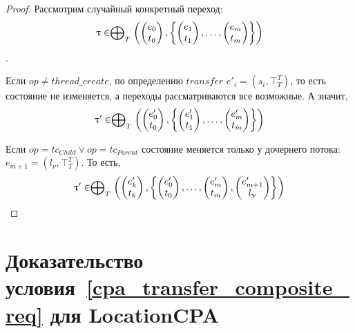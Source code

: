 \begin{proof}
Рассмотрим случайный конкретный переход:
$$\uptau \in  \mathrel{\bigoplus}_{T}
\left(
\begin{pmatrix}
e_0 \\
t_0 
\end{pmatrix},
\left\{
\begin{pmatrix}
e_1 \\
t_1 
\end{pmatrix},
\dots ,
\begin{pmatrix}
e_m \\
t_m 
\end{pmatrix}
\right\}
\right)$$.

Если $op \neq thread\_create$, по определению $transfer$ $e'_i = (s_i, \top^T_T)$, то есть состояние не изменяется, а переходы рассматриваются все возможные. 
А значит, 
$$\uptau' \in  \mathrel{\bigoplus}_{T}
\left(
\begin{pmatrix}
e'_0 \\
t_0 
\end{pmatrix},
\left\{
\begin{pmatrix}
e'_1 \\
t_1 
\end{pmatrix},
\dots ,
\begin{pmatrix}
e'_m \\
t_m 
\end{pmatrix}
\right\}
\right)$$

Если $op = tc_{Child} \lor op = tc_{Parent}$ состояние меняется только у дочернего потока: $e_{m+1} = (l_{\nu}, \top^T_T)$.
То есть, 
$$\uptau' \in  \mathrel{\bigoplus}_{T}
\left(
\begin{pmatrix}
e'_k \\
t_k 
\end{pmatrix},
\left\{
\begin{pmatrix}
e'_0 \\
t_0 
\end{pmatrix},
\dots ,
\begin{pmatrix}
e'_m \\
t_m 
\end{pmatrix} ,
\begin{pmatrix}
e'_{m+1} \\
l_{\upnu} 
\end{pmatrix}
\right\}
\right)$$

\end{proof}

\section{Доказательство условия~\ref{cpa_transfer_composite_req} для LocationCPA}
\label{sect_transfer_location_proof}


